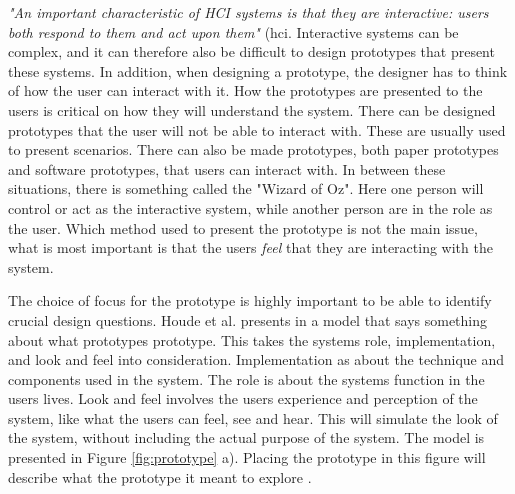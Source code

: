 \emph{"An important characteristic of HCI systems is that they are interactive: users both respond to them and act upon them"} \cite{mackayprototyping} (\ac{hci}. Interactive systems can be complex, and it can therefore also be difficult to design prototypes that present these systems. In addition, when designing a prototype, the designer has to think of how the user can interact with it. How the prototypes are presented to the users is critical on how they will understand the system. There can be designed prototypes that the user will not be able to interact with. These are usually used to present scenarios. There can also be made prototypes, both paper prototypes and software prototypes, that users can interact with. In between these situations, there is something called the "Wizard of Oz". Here one person will control or act as the interactive system, while another person are in the role as the user. Which method used to present the prototype is not the main issue, what is most important is that the users \emph{feel} that they are interacting with the system.

The choice of focus for the prototype is highly important to be able to identify crucial design questions. Houde et al. presents in \cite{houde1997prototypes} a model that says something about what prototypes prototype. This takes the systems role, implementation, and look and feel into consideration. Implementation as about the technique and components used in the system. The role is about the systems function in the users lives. Look and feel involves the users experience and perception of the system, like what the users can feel, see and hear. This will simulate the look of the system, without including the actual purpose of the system. The model is presented in Figure \ref{fig:prototype} a). Placing the prototype in this figure will describe what the prototype it meant to explore \cite{houde1997prototypes}.    

